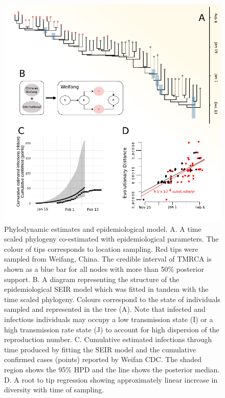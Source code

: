 \documentclass[9pt,lineno,onehalfspacing]{elife}
\begin{document}
\begin{figure}
\begin{fullwidth}
\includegraphics[width=.9\linewidth]{fig1_2.pdf}
\caption{ Phylodynamic estimates and epidemiological model. A. A time scaled phylogeny co-estimated with epidemiological parameters. The colour of tips corresponds to location sampling. Red tips were sampled from Weifang, China. The credible interval of TMRCA is shown as a blue bar for all nodes with more than 50\% posterior support. B. A diagram representing the structure of the epidemiological SEIR model which was fitted in tandem with the time scaled phylogeny. Colours correspond to the state of individuals sampled and represented in the tree (A). Note that infected and infectious individuals may occupy a low transmission state (I) or a high transmission rate state (J) to account for high dispersion of the reproduction number. C. Cumulative estimated infections through time produced by fitting the SEIR model and the cumulative confirmed cases (points) reported by Weifan CDC. The shaded region shows the 95\% HPD and the line shows the posterior median. D. A root to tip regression showing approximately linear increase in diversity with time of sampling. 
}
\label{fig:fig1}

\end{fullwidth}
\end{figure}
\end{document}
